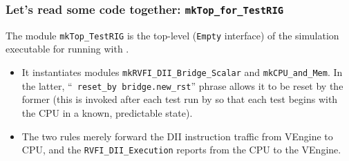 \begin{frame}[fragile]
\frametitle{Let's read some code together: {\tt mkTop\_for\_TestRIG}}

\begin{center}\scriptsize

 \vspace*{5ex}
 
 \begin{minipage}{0.9\textwidth}

   The module {\tt mkTop\_TestRIG} is the top-level ({\tt Empty}
     interface) of the simulation executable for running with
     {\TESTRIG}.

   \begin{itemize}

      \item It instantiates modules {\tt mkRVFI\_DII\_Bridge\_Scalar}
            and {\tt mkCPU\_and\_Mem}.  In the latter, ``{\tt
            reset\_by~bridge.new\_rst}'' phrase allows it to be reset
            by the former (this is invoked after each test run by
            {\TESTRIG} so that each test begins with the CPU in a
            known, predictable state).

      \item The two rules merely forward the DII instruction traffic
            from VEngine to CPU, and the {\tt RVFI\_DII\_Execution}
            reports from the CPU to the VEngine.

   \end{itemize}
 \end{minipage}
\end{center}

\end{frame}


